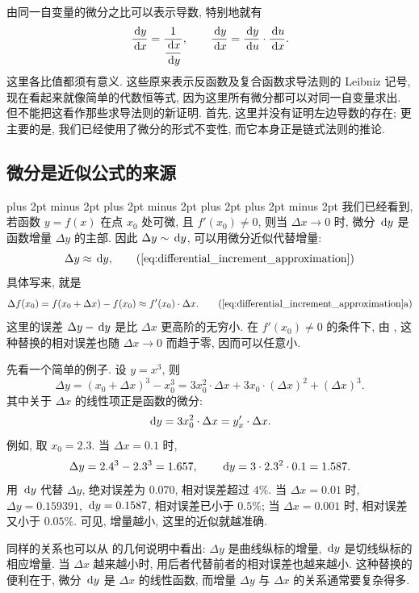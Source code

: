 \begin{remark}\label{note:differential_form_invariance_limits}
由同一自变量的微分之比可以表示导数, 特别地就有
$$
\frac{\,\mathrm{d} y}{\,\mathrm{d} x}=\frac1{\dfrac{\,\mathrm{d} x}{\,\mathrm{d} y}},\qquad
\frac{\,\mathrm{d} y}{\,\mathrm{d} x}=\frac{\,\mathrm{d} y}{\,\mathrm{d} u}\cdot\frac{\,\mathrm{d} u}{\,\mathrm{d} x}.
$$
这里各比值都须有意义.
这些原来表示反函数及复合函数求导法则的 Leibniz 记号,
现在看起来就像简单的代数恒等式, 因为这里所有微分都可以对同一自变量求出.
但不能把这看作那些求导法则的新证明.
首先, 这里并没有证明左边导数的存在;
更主要的是, 我们已经使用了微分的形式不变性, 而它本身正是链式法则的推论.
\end{remark}

\subsection{微分是近似公式的来源}\label{subsec:107}
\begingroup
\abovedisplayskip=8pt plus 2pt minus 2pt
\belowdisplayskip=8pt plus 2pt minus 2pt
\abovedisplayshortskip=4pt plus 2pt
\belowdisplayshortskip=4pt plus 2pt minus 2pt
我们已经看到, 若函数 $y=f(x)$ 在点 $x_0$ 处可微, 且 $f'(x_0)\neq0$,
则当 $\Delta x\to0$ 时, 微分 $\,\mathrm{d} y$ 是函数增量 $\Delta y$ 的主部.
因此 $\Delta y\sim\,\mathrm{d} y$, 可以用微分近似代替增量:
\begin{equation*}
\Delta y\approx\d y,
\tag{\ref{eq:differential_increment_approximation}}
\end{equation*}
具体写来, 就是
\begin{equation*}
\Delta f(x_0)=f(x_0+\Delta x)-f(x_0)\approx f'(x_0)\cdot\Delta x.
\tag{\ref{eq:differential_increment_approximation}a}\label{eq:function_increment_linear_approximation}
\end{equation*}
这里的误差 $\Delta y-\,\mathrm{d} y$ 是比 $\Delta x$ 更高阶的无穷小.
在 $f'(x_0)\neq0$ 的条件下, 由 ,
这种替换的相对误差也随 $\Delta x\to0$ 而趋于零, 因而可以任意小.

先看一个简单的例子. 设 $y=x^3$, 则
$$
\Delta y=(x_0+\Delta x)^3-x_0^3
=3x_0^2\cdot\Delta x+3x_0\cdot(\Delta x)^2+(\Delta x)^3.
$$
其中关于 $\Delta x$ 的线性项正是函数的微分:
$$
\,\mathrm{d} y=3x_0^2\cdot\Delta x=y'_x\cdot\Delta x.
$$
例如, 取 $x_0=2.3$.
当 $\Delta x=0.1$ 时,
$$
\Delta y=2.4^3-2.3^3=1.657,
\qquad
\,\mathrm{d} y=3\cdot2.3^2\cdot0.1=1.587.
$$
用 $\,\mathrm{d} y$ 代替 $\Delta y$, 绝对误差为 $0.070$, 相对误差超过 $4\%$.
当 $\Delta x=0.01$ 时, $\Delta y=0.159391$, $\,\mathrm{d} y=0.1587$,
相对误差已小于 $0.5\%$;
当 $\Delta x=0.001$ 时, 相对误差又小于 $0.05\%$.
可见, 增量越小, 这里的近似就越准确.

同样的关系也可以从  的几何说明中看出:
$\Delta y$ 是曲线纵标的增量, $\,\mathrm{d} y$ 是切线纵标的相应增量.
当 $\Delta x$ 越来越小时, 用后者代替前者的相对误差也越来越小.
这种替换的便利在于, 微分 $\,\mathrm{d} y$ 是 $\Delta x$ 的线性函数,
而增量 $\Delta y$ 与 $\Delta x$ 的关系通常要复杂得多.

